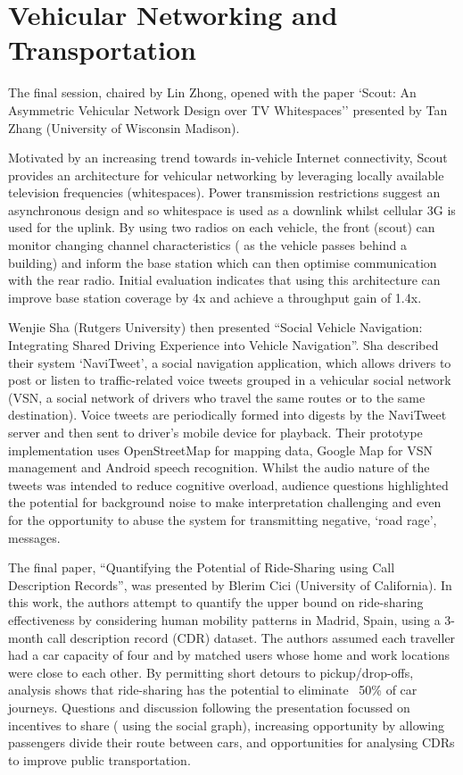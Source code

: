 \section{Vehicular Networking and Transportation}
\label{sec:vehiclenets}

The final session, chaired by Lin Zhong, opened with the paper `Scout: An 
Asymmetric Vehicular Network Design over TV Whitespaces'' presented by Tan Zhang 
(University of Wisconsin Madison).

Motivated by an increasing trend towards in-vehicle Internet connectivity, Scout 
provides an architecture for vehicular networking by leveraging locally available 
television frequencies (whitespaces). Power transmission restrictions suggest an 
asynchronous design and so whitespace is used as a downlink whilst cellular 3G is 
used for the uplink. By using two radios on each vehicle, the front (scout) can 
monitor changing channel characteristics (\eg{} as the vehicle passes behind a 
building) and inform the base station which can then optimise communication with 
the rear radio. Initial evaluation indicates that using this architecture can 
improve base station coverage by 4x and achieve a throughput gain of 1.4x.

Wenjie Sha (Rutgers University) then presented ``Social Vehicle Navigation: 
Integrating Shared Driving Experience into Vehicle Navigation''. Sha described 
their system `NaviTweet', a social navigation application, which allows drivers 
to post or listen to traffic-related voice tweets grouped in a vehicular social 
network (VSN, a social network of drivers who travel the same routes or to the 
same destination). Voice tweets are periodically formed into digests by the 
NaviTweet server and then sent to driver's mobile device for playback. Their 
prototype implementation uses OpenStreetMap for mapping data, Google Map for VSN 
management and Android speech recognition. Whilst the audio nature of the tweets 
was intended to reduce cognitive overload, audience questions highlighted the 
potential for background noise to make interpretation challenging and even for 
the opportunity to abuse the system for transmitting negative, `road rage', 
messages.

The final paper, ``Quantifying the Potential of Ride-Sharing using Call 
Description Records'', was presented by Blerim Cici (University of California). 
In this work, the authors attempt to quantify the upper bound on ride-sharing 
effectiveness by considering human mobility patterns in Madrid, Spain, using a
3-month call description record (CDR) dataset. The authors assumed each traveller 
had a car capacity of four and by matched users whose home and work locations 
were close to each other. By permitting short detours to pickup\slash drop-offs,
analysis shows that ride-sharing has the potential to eliminate ~50\% of car 
journeys. Questions and discussion following the presentation focussed on 
incentives to share (\eg{} using the social graph), increasing opportunity by 
allowing passengers divide their route between cars, and opportunities for 
analysing CDRs to improve public transportation.